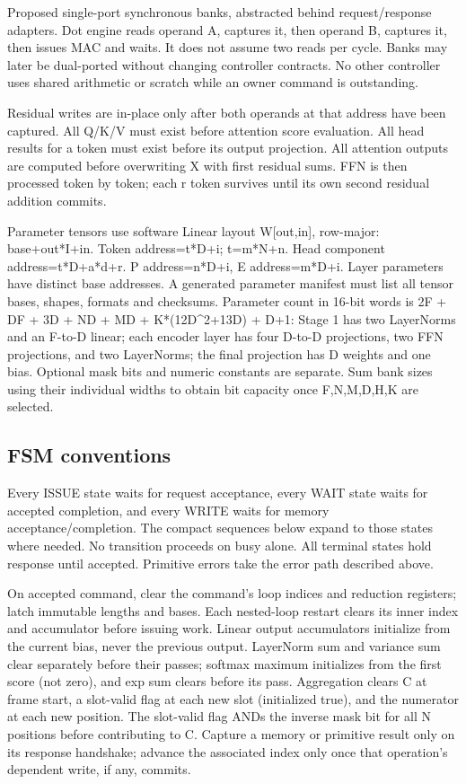 \documentclass[11pt,a4paper]{article}
\begin{document}
Proposed single-port synchronous banks, abstracted behind request/response adapters. Dot engine reads operand A, captures it, then operand B, captures it, then issues MAC and waits. It does not assume two reads per cycle. Banks may later be dual-ported without changing controller contracts. No other controller uses shared arithmetic or scratch while an owner command is outstanding.

Residual writes are in-place only after both operands at that address have been captured. All Q/K/V must exist before attention score evaluation. All head results for a token must exist before its output projection. All attention outputs are computed before overwriting X with first residual sums. FFN is then processed token by token; each r token survives until its own second residual addition commits.

Parameter tensors use software Linear layout W[out,in], row-major: base+out*I+in. Token address=t*D+i; t=m*N+n. Head component address=t*D+a*d+r. P address=n*D+i, E address=m*D+i. Layer parameters have distinct base addresses. A generated parameter manifest must list all tensor bases, shapes, formats and checksums. Parameter count in 16-bit words is 2F + DF + 3D + ND + MD + K*(12D\textasciicircum{}2+13D) + D+1: Stage 1 has two LayerNorms and an F-to-D linear; each encoder layer has four D-to-D projections, two FFN projections, and two LayerNorms; the final projection has D weights and one bias. Optional mask bits and numeric constants are separate. Sum bank sizes using their individual widths to obtain bit capacity once F,N,M,D,H,K are selected.

\subsection{FSM conventions}
Every ISSUE state waits for request acceptance, every WAIT state waits for accepted completion, and every WRITE waits for memory acceptance/completion. The compact sequences below expand to those states where needed. No transition proceeds on busy alone. All terminal states hold response until accepted. Primitive errors take the error path described above.

On accepted command, clear the command's loop indices and reduction registers; latch immutable lengths and bases. Each nested-loop restart clears its inner index and accumulator before issuing work. Linear output accumulators initialize from the current bias, never the previous output. LayerNorm sum and variance sum clear separately before their passes; softmax maximum initializes from the first score (not zero), and exp sum clears before its pass. Aggregation clears C at frame start, a slot-valid flag at each new slot (initialized true), and the numerator at each new position. The slot-valid flag ANDs the inverse mask bit for all N positions before contributing to C. Capture a memory or primitive result only on its response handshake; advance the associated index only once that operation's dependent write, if any, commits.
\end{document}
